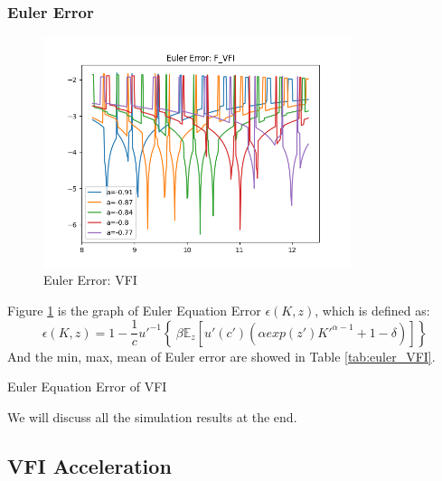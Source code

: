 \documentclass{article}
\begin{document}
	\subsubsection{Euler Error}
	
	\begin{figure}[H]
		\centering
		\includegraphics[width=0.8\textwidth]{../figures/problem_set_2/F_EulerErr.png}
		\caption{Euler Error: VFI}
		\label{fig:euler_VFI}
	\end{figure}
	Figure \ref{fig:euler_VFI} is the graph of Euler Equation Error $\epsilon(K,z)$, which is defined as:
	\begin{equation}
		\epsilon(K,z)=1-\frac{1}{c}u'^{-1}\left\{\ \beta\mathbb{E}_{z} [u'(c')(\alpha exp(z') K'^{\alpha -1 } +1 -\delta)] \right\}
	\end{equation}
	And the min, max, mean of Euler error are showed in Table \ref{tab:euler_VFI}.
	\begin{table}[H]
		\centering
		
		\caption{Euler Equation Error of VFI}
		\label{tab:euler_VFI}
	\end{table}
	
	We will discuss all the simulation results at the end.
	
	\subsection{VFI Acceleration}
	
\end{document}
